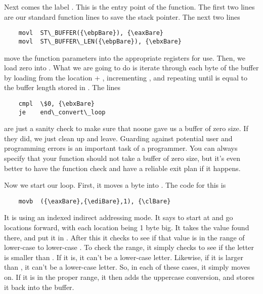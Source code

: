 Next comes the label 
.  This is the entry point of
the function.  The first two lines are our standard function lines
to save the stack pointer.  The next two lines

\begin{simpletyping}
\begin{lstlisting}
	movl  ST\_BUFFER({\ebpBare}), {\eaxBare}
	movl  ST\_BUFFER\_LEN({\ebpBare}), {\ebxBare}
\end{lstlisting}
\end{simpletyping}

move the function parameters into the appropriate registers for use.
Then, we load zero into {\ediReg}.  What we are going to do is iterate
through each byte of the buffer by loading from the location 
{\eaxReg} + {\ediReg}, incrementing {\ediReg}, and repeating until {\ediReg}
is equal to the buffer length stored in {\ebxReg}.  The lines 

\begin{simpletyping}
\begin{lstlisting}
	cmpl  \$0, {\ebxBare}
	je    end\_convert\_loop
\end{lstlisting}
\end{simpletyping}

are just a sanity check to make sure that noone gave us a buffer of
zero size.  If they did, we just clean up and leave.  Guarding
against potential user and programming errors is an important
task of a programmer.  You can always specify that your function should
not take a buffer of zero size, but it's even better to have the
function check and have a reliable exit plan if it happens.

Now we start our loop.  First,
it moves a byte into {\clReg}.  The code for this is

\begin{simpletyping}
\begin{lstlisting}
	movb  ({\eaxBare},{\ediBare},1), {\clBare}
\end{lstlisting}
\end{simpletyping}

It is using an indexed indirect addressing mode.  
It says to start at {\eaxReg} 
and go {\ediReg} locations forward, with each
location being 1 byte big.  It takes the value found there, and put it in
{\clReg}.  After this it checks to see if that value is in the range
of lower-case  to lower-case .
To check the range, it simply checks to see if the letter is smaller than 
.  If it is, it can't be a lower-case letter.  Likewise,
if it is larger than , it can't be a lower-case letter.
So, in each of these cases, it simply moves on.  If it is in the proper range, it
then adds the uppercase conversion, and stores it back into the buffer.

